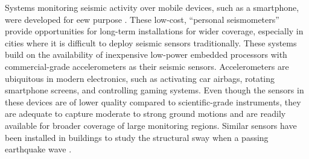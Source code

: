 \documentclass{article}
\begin{document}
Systems monitoring seismic activity over mobile devices, such as a smartphone, were developed for \gls{eew} purpose \autocite{kong2016myshake}.
These low-cost, ``personal seismometers'' provide opportunities for long-term installations for wider coverage, especially in cities where it is difficult to deploy seismic sensors traditionally.
These systems build on the availability of inexpensive low-power embedded processors with commercial-grade accelerometers as their seismic sensors.
Accelerometers are ubiquitous in modern electronics, such as activating car airbags, rotating smartphone screens, and controlling gaming systems.
Even though the sensors in these devices are of lower quality compared to scientific-grade instruments, they are adequate to capture moderate to strong ground motions and are readily available for broader coverage of large monitoring regions.
Similar sensors have been installed in buildings to study the structural sway when a passing earthquake wave \autocite{kurata2017development}.
\end{document}
